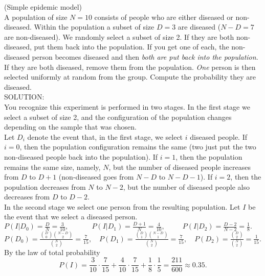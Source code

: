 \documentclass[12pt]{article}
\begin{document}
\newpage



 (Simple epidemic model)\label{simpleepidemicmodel}\\
A population of size $N=10$ consists of people who are either diseased or non-diseased.
Within the population a subset of size $D=3$ are diseased ($N-D=7$ are non-diseased).
We randomly select a subset of size 2.
If they are both non-diseased, put them back into the population.
If you get one of each, the non-diseased person becomes diseased and then {\em both are put back into the population}.
If they are both diseased, remove them from the population.
{\em One} person is then selected uniformly at random from the group. Compute the probability they are diseased.\\

\noindent SOLUTION:\\
You recognize this experiment is performed in two stages.
In the first stage we select a subset of size 2, and the configuration
of the population changes depending on the sample that was chosen.\\

\noindent Let $D_i$ denote the event that, in the first stage, we select $i$ diseased people.
If $i=0$, then the population configuration remains the same (two just put the two non-diseased people back into the population).
If $i=1$, then the population remains the same size, namely, $N$, but the number of diseased people increases from $D$ to $D+1$ (non-diseased goes from $N-D$ to $N-D-1$).
If $i=2$, then the population decreases from $N$ to $N-2$, but the number of diseased people also decreases from $D$ to $D-2$.\\

\noindent In the second stage we select one person from the resulting population.  Let $I$ be the event that we select a diseased person.\\

$P(I|D_0) = \frac DN= \frac {3}{10},\qquad\quad\  P(I|D_1) = \frac {D+1}N=\frac {4}{10},\qquad\ \  P(I|D_2) = \frac {D-2}{N-2}= \frac {1}{8}.$\\

$P(D_0) = \frac {{D\choose 0}{N-D\choose 2}}{{N\choose 2}}=\frac 7{15},\quad P(D_1) = \frac {{D\choose 1}{N-D\choose 1}}{{N\choose 2}}=\frac 7{15},\quad P(D_2) = \frac {{D\choose 2}}{{N\choose 2}}=\frac 1{15}.$\\

\noindent By the law of total probability
$$P(I) = \frac 3{10}\cdot \frac 7{15} + \frac 4{10}\cdot \frac 7{15} + \frac 18\cdot \frac 15=\frac {211}{600}\approx 0.35.$$
\end{document}
